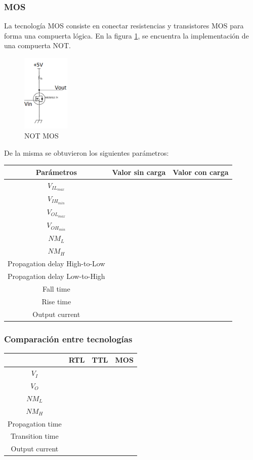 \subsubsection{MOS}
La tecnología MOS consiste en conectar resistencias y transistores MOS para forma una compuerta lógica. En la figura \ref{fig:eje1_3}, se encuentra la implementación de una compuerta NOT.
\begin{figure}[H]
	\centering
	\includegraphics[width=0.2\textwidth]{Ejercicio1/MOS.png}
	\caption{NOT MOS}
	\label{fig:eje1_3}
\end{figure}
De la misma se obtuvieron los siguientes parámetros:
\begin{table}[H]
	\centering
	\begin{tabular}{|c|c|c|}
		\hline
		Parámetros & Valor sin carga & Valor con carga\\
		\hline
		$V_{IL_{max}}$ & & \\
		\hline
		$V_{IH_{min}}$ & & \\
		\hline
		$V_{OL_{max}}$ & & \\
		\hline
		$V_{OH_{min}}$ & & \\
		\hline
		$NM_{L}$ & & \\
		\hline
		$NM_{H}$ & & \\
		\hline
		Propagation delay High-to-Low & & \\
		\hline
		Propagation delay Low-to-High & & \\
		\hline
		Fall time & & \\
		\hline
		Rise time & & \\
		\hline
		Output current & & \\
		\hline
	\end{tabular}
\end{table}

\subsubsection{Comparación entre tecnologías}
\begin{table}[H]
	\centering
	\begin{tabular}{|c|c|c|c|}
		\hline
		\diagbox{Parámetros}{Tecnologías} & RTL	& TTL & MOS\\
		\hline
		$V_I$ & & & \\
		\hline
		$V_O$ & & & \\
		\hline
		$NM_{L}$ & & & \\
		\hline
		$NM_{H}$ & & & \\
		\hline
		Propagation time & & & \\
		\hline
		Transition time & & & \\
		\hline
		Output current & & & \\
		\hline
	\end{tabular}
\end{table}